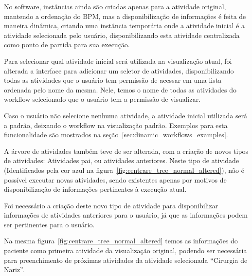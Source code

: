 No software, instâncias ainda são criadas apenas para a atividade original, mantendo a ordenação do BPM, mas a disponibilização de informações é feita de maneira dinâmica, criando uma instância temporária onde a atividade inicial é a atividade selecionada pelo usuário, disponibilizando esta atividade centralizada como ponto de partida para sua execução.

Para selecionar qual atividade inicial será utilizada na visualização atual, foi alterada a interface para adicionar um seletor de atividades, disponibilizando todas as atividades que o usuário tem permissão de acessar em uma lista ordenada pelo nome da mesma. Nele, temos o nome de todas as atividades do workflow selecionado que o usuário tem a permissão de visualizar.

Caso o usuário não selecione nenhuma atividade, a atividade inicial utilizada será a padrão, deixando o workflow na visualização padrão. Exemplos para esta funcionalidade são mostrados na seção~\ref{sec:dinamic_workflows_examples}.

A árvore de atividades também teve de ser alterada, com a criação de novos tipos de atividades: Atividades pai, ou atividades anteriores. Neste tipo de atividade (Identificados pela cor azul na figura~\ref{fig:centrare_tree_normal_altered}), não é possível executar novas atividades, sendo existentes apenas por motivos de disponibilização de informações pertinentes à execução atual.

Foi necessário a criação deste novo tipo de atividade para disponibilizar informações de atividades anteriores para o usuário, já que as informações podem ser pertinentes para o usuário.

Na mesma figura~\ref{fig:centrare_tree_normal_altered} temos as informações do paciente como primeira atividade da visualização original, podendo ser necessária para preenchimento de próximas atividades da atividade selecionada ``Cirurgia de Nariz''.

